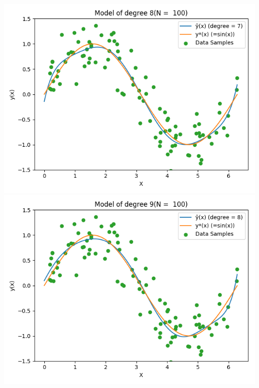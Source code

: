 \documentclass{article}
\begin{document}
\includegraphics[width=\linewidth]{8_100.png}
\includegraphics[width=\linewidth]{9_100.png}
\end{document}
